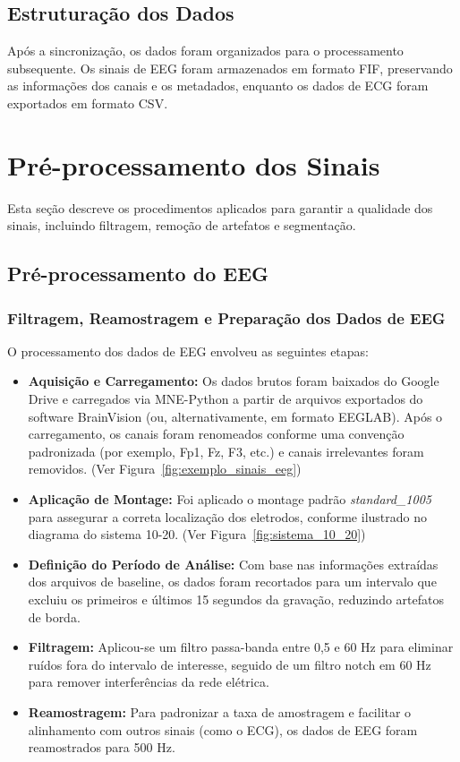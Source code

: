 \subsection{Estruturação dos Dados}

Após a sincronização, os dados foram organizados para o processamento subsequente. Os sinais de EEG foram armazenados em formato FIF, preservando as informações dos canais e os metadados, enquanto os dados de ECG foram exportados em formato CSV.


\section{Pré-processamento dos Sinais}

Esta seção descreve os procedimentos aplicados para garantir a qualidade dos sinais, incluindo filtragem, remoção de artefatos e segmentação.

\subsection{Pré-processamento do EEG}

\subsubsection{Filtragem, Reamostragem e Preparação dos Dados de EEG}

O processamento dos dados de EEG envolveu as seguintes etapas:
\begin{itemize}
    \item \textbf{Aquisição e Carregamento:} Os dados brutos foram baixados do Google Drive e carregados via MNE-Python a partir de arquivos exportados do software BrainVision (ou, alternativamente, em formato EEGLAB). Após o carregamento, os canais foram renomeados conforme uma convenção padronizada (por exemplo, Fp1, Fz, F3, etc.) e canais irrelevantes foram removidos. (Ver Figura~\ref{fig:exemplo_sinais_eeg})
    \item \textbf{Aplicação de Montage:} Foi aplicado o montage padrão \textit{standard\_1005} para assegurar a correta localização dos eletrodos, conforme ilustrado no diagrama do sistema 10-20. (Ver Figura~\ref{fig:sistema_10_20})
    \item \textbf{Definição do Período de Análise:} Com base nas informações extraídas dos arquivos de baseline, os dados foram recortados para um intervalo que excluiu os primeiros e últimos 15 segundos da gravação, reduzindo artefatos de borda.
    \item \textbf{Filtragem:} Aplicou-se um filtro passa-banda entre 0,5 e 60 Hz para eliminar ruídos fora do intervalo de interesse, seguido de um filtro notch em 60 Hz para remover interferências da rede elétrica.
    \item \textbf{Reamostragem:} Para padronizar a taxa de amostragem e facilitar o alinhamento com outros sinais (como o ECG), os dados de EEG foram reamostrados para 500 Hz.
\end{itemize}

